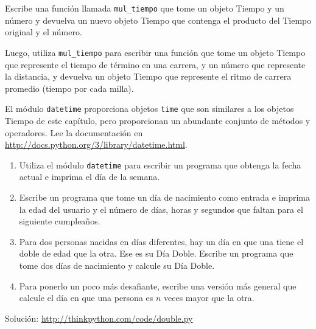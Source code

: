\documentclass[10pt]{book}
\begin{document}
\begin{exercise}

Escribe una función llamada \verb"mul_tiempo" que tome un objeto Tiempo
y un número y devuelva un nuevo objeto Tiempo que contenga
el producto del Tiempo original y el número.

Luego, utiliza \verb"mul_tiempo" para escribir una función que tome un objeto
Tiempo que represente el tiempo de término en una carrera, y un número
que represente la distancia, y devuelva un objeto Tiempo que represente
el ritmo de carrera promedio (tiempo por cada milla).

\end{exercise}


\begin{exercise}

El módulo {\tt datetime} proporciona objetos {\tt time}
que son similares a los objetos Tiempo de este capítulo, pero
proporcionan un abundante conjunto de métodos y operadores.  Lee la
documentación en \url{http://docs.python.org/3/library/datetime.html}.

\begin{enumerate}

\item Utiliza el módulo {\tt datetime} para escribir un programa que obtenga la
  fecha actual e imprima el día de la semana.

\item Escribe un programa que tome un día de nacimiento como entrada e imprima la
  edad del usuario y el número de días, horas y segundos que faltan para
  el siguiente cumpleaños.

\item Para dos personas nacidas en días diferentes, hay un día en que una
  tiene el doble de edad que la otra.  Ese es su Día Doble.  Escribe un
  programa que tome dos días de nacimiento y calcule su Día Doble.

\item Para ponerlo un poco más desafiante, escribe una versión más general que
  calcule el día en que una persona es $n$ veces mayor que la otra.

\end{enumerate}

Solución: \url{http://thinkpython.com/code/double.py}

\end{exercise}
\end{document}
